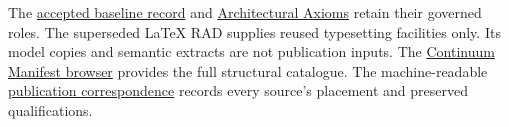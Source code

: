 \documentclass[10pt,a4paper,oneside,headings=small]{scrreprt}
\begin{document}
The \href{../../../../design/register/1.1.7/hcrl-1.1.7-001.complete.md}{accepted baseline record}
and \href{../../../../governance/architectural-axioms.md}{Architectural Axioms}
retain their governed roles. The superseded LaTeX RAD supplies reused typesetting
facilities only. Its model copies and semantic extracts are not publication inputs.
The \href{../../../continuum-manifest/published/1.1.8/continuum.html}{Continuum Manifest browser}
provides the full structural catalogue. The machine-readable \href{structure.json}{publication correspondence}
records every source's placement and preserved qualifications.
\clearpage
{}




\clearpage
{}
{}
\renewcommand{\indexname}{Index of architectural names}
\printindex
\end{document}

